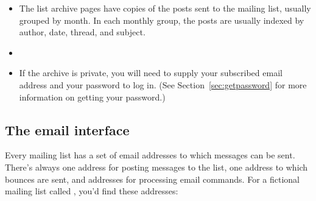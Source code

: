 \documentclass{howto}
\begin{document}
\begin{description}
\begin{itemize}
			\item The list archive pages have copies of the posts sent to the
			mailing list, usually grouped by month.  In each monthly group, the
			posts are usually indexed by author, date, thread, and subject.

			\item {}

			\item If the archive is private, you will need to supply your
			subscribed email address and your password to log in.  (See
			Section~\ref{sec:getpassword} for more information on getting
			your password.)
		\end{itemize}
\end{description}

\subsection{The email interface\label{sec:email}}
Every mailing list has a set of email addresses to which messages can be 
sent.  There's always one address for posting messages to the list, one
address to which bounces are sent, and addresses for processing email
commands.  For a fictional mailing list called
, you'd find these addresses:
\end{document}
